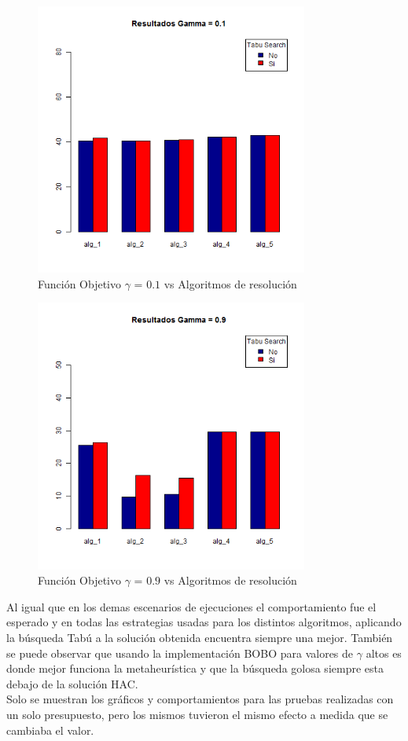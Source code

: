 \begin{figure}[H]
  \centering
    \includegraphics[width=0.8\textwidth]{resultados/cities/Graficos_agrupados/gamma01-cities.png}
  \caption{Función Objetivo $\gamma$ = $0.1$ vs Algoritmos de resolución}
  \label{res:img-cities-agr-gamma01}
\end{figure}

\begin{figure}[H]
  \centering
    \includegraphics[width=0.8\textwidth]{resultados/cities/Graficos_agrupados/gamma09-cities.png}
  \caption{Función Objetivo $\gamma$ = $0.9$ vs Algoritmos de resolución}
  \label{res:img-cities-agr-gamma09}
\end{figure}

Al igual que en los demas escenarios de ejecuciones el comportamiento fue el esperado y en todas las estrategias usadas para los distintos algoritmos, aplicando la búsqueda Tabú a la solución obtenida encuentra siempre una mejor. También se puede observar que usando la implementación BOBO para valores de $\gamma$ altos es donde mejor funciona la metaheurística y que la búsqueda golosa siempre esta debajo de la solución HAC.\\
Solo se muestran los gráficos y comportamientos para las pruebas realizadas con un solo presupuesto, pero los mismos tuvieron el mismo efecto a medida que se cambiaba el valor.
